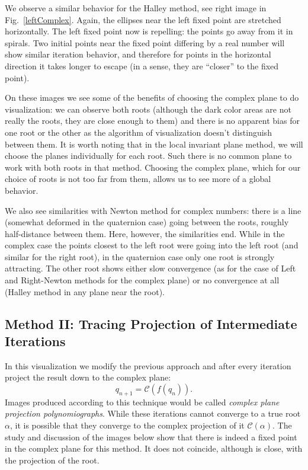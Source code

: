 \documentclass{article}
\theoremstyle{definition}
\def\Cal{\mathcal}
\begin{document}
We observe a similar behavior for the Halley method, see right image in Fig.~\ref{leftComplex}. Again, the ellipses near the left fixed point are stretched horizontally. The left fixed point now is repelling: the points go away from it in spirals. Two initial points near the fixed point differing by a real number will show similar iteration behavior, and therefore for points in the horizontal direction it takes longer to escape (in a sense, they are ``closer'' to the fixed point).

On these images we see some of the benefits of choosing the complex plane to do visualization: we can observe both roots (although the dark color areas are not really the roots, they are close enough to them) and there is no apparent bias for one root or the other as the algorithm of visualization doesn't distinguish between them. It is worth noting that in the local invariant plane method, we will choose the planes individually for each root. Such there is no common plane to work with both roots in that method. Choosing the complex plane, which for our choice of roots is not too far from them, allows us to see more of a global behavior.

We also see similarities with Newton method for complex numbers: there is a line (somewhat deformed in the quaternion case) going between the roots, roughly half-distance between them. Here, however, the similarities end. While in the complex case the points closest to the left root were going into the left root (and similar for the right root), in the quaternion case only one root is strongly attracting. The other root shows either slow convergence (as for the case of Left and Right-Newton methods for the complex plane) or no convergence at all (Halley method in any plane near the root).\\

\subsection{Method II: Tracing Projection of Intermediate Iterations}
In this visualization we modify the previous approach and
after every iteration project the result down to the complex plane:
\begin{equation}
q_{n+1}={\Cal C}(f(q_n)).\label{ComplexPlaneProj}
\end{equation}
Images produced according to this technique would be called {\it complex plane projection polynomiographs}. While these iterations cannot converge to a true root $\alpha$, it is possible that they converge to the complex projection of it $\mathcal C(\alpha)$. The study and discussion of the images below show that there is indeed a fixed point in the complex plane for this method. It does not coincide, although is close, with the projection of the root.
\end{document}

